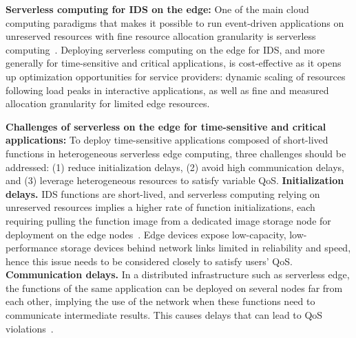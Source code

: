 \textbf{Serverless computing for IDS on the edge:} One of the main cloud computing paradigms that makes it possible to run event-driven applications on unreserved resources with fine resource allocation granularity is serverless computing~\cite{Lannurien2023}. Deploying serverless computing on the edge for IDS, and more generally for time-sensitive and critical applications, is cost-effective as it opens up optimization opportunities for service providers: dynamic scaling of resources following load peaks in interactive applications, as well as fine and measured allocation granularity for limited edge resources.

\textbf{Challenges of serverless on the edge for time-sensitive and critical applications:}
To deploy time-sensitive applications composed of short-lived functions in heterogeneous serverless edge computing, three challenges should be addressed: (1) reduce initialization delays, (2) avoid high communication delays, and (3) leverage heterogeneous resources to satisfy variable QoS.
\textbf{Initialization delays.} IDS functions are short-lived, and serverless computing relying on unreserved resources implies a higher rate of function initializations, each requiring pulling the function image from a dedicated image storage node for deployment on the edge nodes~\cite{yanHermesEfficientCache2020}. Edge devices expose low-capacity, low-performance storage devices behind network links limited in reliability and speed, hence this issue needs to be considered closely to satisfy users' QoS.
\textbf{Communication delays.} In a distributed infrastructure such as serverless edge, the functions of the same application can be deployed on several nodes far from each other, implying the use of the network when these functions need to communicate intermediate results. This causes delays that can lead to QoS violations~\cite{wawrzoniakBoxerDataAnalytics2021a}.
